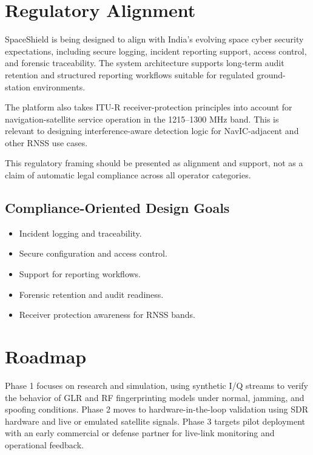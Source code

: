\documentclass[11pt,a4paper]{article}
\begin{document}
\section{Regulatory Alignment}

SpaceShield is being designed to align with India’s evolving space cyber security expectations, including secure logging, incident reporting support, access control, and forensic traceability. The system architecture supports long-term audit retention and structured reporting workflows suitable for regulated ground-station environments.

The platform also takes ITU-R receiver-protection principles into account for navigation-satellite service operation in the 1215--1300 MHz band. This is relevant to designing interference-aware detection logic for NavIC-adjacent and other RNSS use cases.

This regulatory framing should be presented as alignment and support, not as a claim of automatic legal compliance across all operator categories.

\subsection{Compliance-Oriented Design Goals}

\begin{itemize}
    \item Incident logging and traceability.
    \item Secure configuration and access control.
    \item Support for reporting workflows.
    \item Forensic retention and audit readiness.
    \item Receiver protection awareness for RNSS bands.
\end{itemize}

\section{Roadmap}

Phase 1 focuses on research and simulation, using synthetic I/Q streams to verify the behavior of GLR and RF fingerprinting models under normal, jamming, and spoofing conditions. Phase 2 moves to hardware-in-the-loop validation using SDR hardware and live or emulated satellite signals. Phase 3 targets pilot deployment with an early commercial or defense partner for live-link monitoring and operational feedback.
\end{document}
